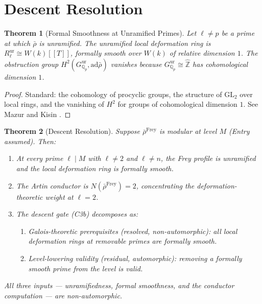 \documentclass[12pt]{amsart}
\newtheorem{theorem}{Theorem}[section]
\theoremstyle{definition}
\theoremstyle{remark}
\newcommand{\GL}{\mathrm{GL}}
\newcommand{\ad}{\mathrm{ad}}
\newcommand{\rhobar}{\bar{\rho}}
\newcommand{\Qp}{\mathbb{Q}_p}
\begin{document}
\section{Descent Resolution}
\label{sec:descent-resolution}

\begin{theorem}[Formal Smoothness at Unramified Primes]\label{thm:formal-smooth}
Let $\ell \neq p$ be a prime at which $\rhobar$ is unramified. The unramified local deformation ring is $R^{\mathrm{ur}}_\ell \cong W(k)[[T]]$, formally smooth over $W(k)$ of relative dimension $1$. The obstruction group $H^2(G^{\mathrm{ur}}_{\Qp}, \ad\rhobar)$ vanishes because $G^{\mathrm{ur}}_{\Qp} \cong \hat{\mathbb{Z}}$ has cohomological dimension $1$.
\end{theorem}

\begin{proof}
Standard: the cohomology of procyclic groups, the structure of $\GL_2$ over local rings, and the vanishing of $H^2$ for groups of cohomological dimension $1$. See Mazur \cite{Mazur89} and Kisin \cite{Kisin09a}.
\end{proof}

\begin{theorem}[Descent Resolution]\label{thm:descent-resolution}
Suppose $\rhobar^{\mathrm{Frey}}$ is modular at level $M$ (Entry assumed). Then:
\begin{enumerate}[label=(\alph*)]
\item At every prime $\ell \mid M$ with $\ell \neq 2$ and $\ell \neq n$, the Frey profile is unramified and the local deformation ring is formally smooth.
\item The Artin conductor is $N(\rhobar^{\mathrm{Frey}}) = 2$, concentrating the deformation-theoretic weight at $\ell = 2$.
\item The descent gate (C3b) decomposes as:
\begin{enumerate}[label=(\roman*)]
\item \emph{Galois-theoretic prerequisites} (resolved, non-automorphic): all local deformation rings at removable primes are formally smooth.
\item \emph{Level-lowering validity} (residual, automorphic): removing a formally smooth prime from the level is valid.
\end{enumerate}
\end{enumerate}
All three inputs --- unramifiedness, formal smoothness, and the conductor computation --- are non-automorphic.
\end{theorem}
\end{document}
